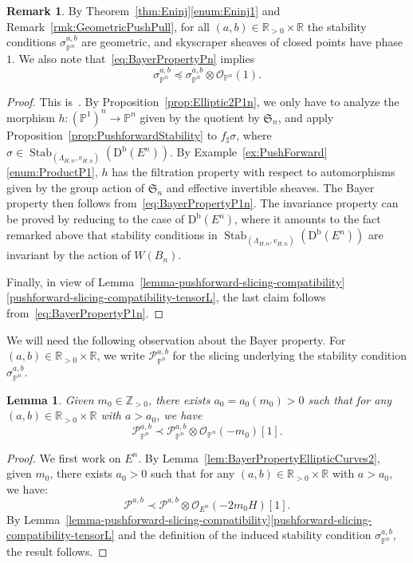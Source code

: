 \documentclass[11pt, reqno]{amsart}
\numberwithin{equation}{section}
\theoremstyle{plain}
\newtheorem{lemma}[theorem]{Lemma}
\theoremstyle{remark}
\theoremstyle{definition}
\newtheorem{remark}[theorem]{Remark}
\theoremstyle{italicsname}
\newcommand{\Db}{\mathrm{D^b}}
\DeclareMathOperator{\Stab}{Stab}
\newcommand{\cO}{\mathcal{O}}
\newcommand{\cP}{\mathscr{P}}
\newcommand{\fS}{\mathfrak{S}}
\def\RR{\ensuremath{\mathbb{R}}}
\def\ZZ{\ensuremath{\mathbb{Z}}}
\def\PP{\ensuremath{\mathbb{P}}}
\begin{document}
\begin{remark}
\label{sigmaab-Pn-properties} 
By Theorem~\ref{thm:Eninj}\ref{enum:Eninj1} and Remark~\ref{rmk:GeometricPushPull}, for all $(a,b)\in\RR_{>0}\times\RR$ the stability conditions $\sigma_{\PP^n}^{a,b}$ are geometric, and skyscraper sheaves of closed points have phase~$1$. 
We also note that~\eqref{eq:BayerPropertyPn} implies 
\begin{equation}
\label{eq:BayerPropertyPn-ab}
    \sigma^{a,b}_{\PP^n} \preceq \sigma^{a,b}_{\PP^n} \otimes \cO_{\PP^n}(1). 
\end{equation}
\end{remark}

\begin{proof}
This is~\cite[Theorem 6.3]{chunyi-stability}.
By Proposition~\ref{prop:Elliptic2P1n}, we only have to analyze the morphism $h\colon(\PP^1)^n\to\PP^n$ given by the quotient by $\fS_n$, and apply Proposition~\ref{prop:PushforwardStability} to $f_{\sharp} \sigma$, where $\sigma\in \Stab_{(\Lambda_{H,n},v_{H,n})}(\Db(E^n))$.
By Example~\ref{ex:PushForward}\eqref{enum:ProductP1}, $h$ has the filtration property with respect to automorphisms given by the group action of $\fS_n$ and effective invertible sheaves.
The Bayer property then follows from~\eqref{eq:BayerPropertyP1n}.
The invariance property can be proved by reducing to the case of $\Db(E^n)$, where it amounts to the fact remarked above that stability conditions in $\Stab_{(\Lambda_{H,n},v_{H,n})}(\Db(E^n))$ are 
invariant by the action of $W(B_n)$.

Finally, in view of Lemma~\ref{lemma-pushforward-slicing-compatibility}\ref{pushforward-slicing-compatibility-tensorL}, the last claim follows from~\eqref{eq:BayerPropertyP1n}.
\end{proof}

We will need the following observation about the Bayer property.
For $(a,b) \in \RR_{>0} \times \RR$, we write $\cP_{\PP^n}^{a,b}$ for the slicing underlying the stability condition $\sigma_{\PP^n}^{a,b}$. 

\begin{lemma}\label{lem:BayerPropertyPn}
Given $m_0\in\ZZ_{>0}$, there exists $a_0=a_0(m_0)>0$ such that for any $(a,b)\in\RR_{>0}\times\RR$ with $a>a_0$, we have 
\[
\cP^{a,b}_{\PP^n}\prec\cP^{a,b}_{\PP^n}\otimes\cO_{\PP^n}(-m_0)[1].
\]
\end{lemma}

\begin{proof}
We first work on $E^n$.
By Lemma~\ref{lem:BayerPropertyEllipticCurves2}, given $m_0$, there exists $a_0>0$ such that for any $(a,b)\in\RR_{>0}\times\RR$ with $a>a_0$, we have:
\[
\cP^{a,b}\prec\cP^{a,b} \otimes \cO_{E^n}(-2m_0H)[1].
\]
By Lemma~\ref{lemma-pushforward-slicing-compatibility}\ref{pushforward-slicing-compatibility-tensorL} and the definition of the induced stability condition $\sigma^{a,b}_{\PP^n}$, the result follows.
\end{proof}
\end{document}
